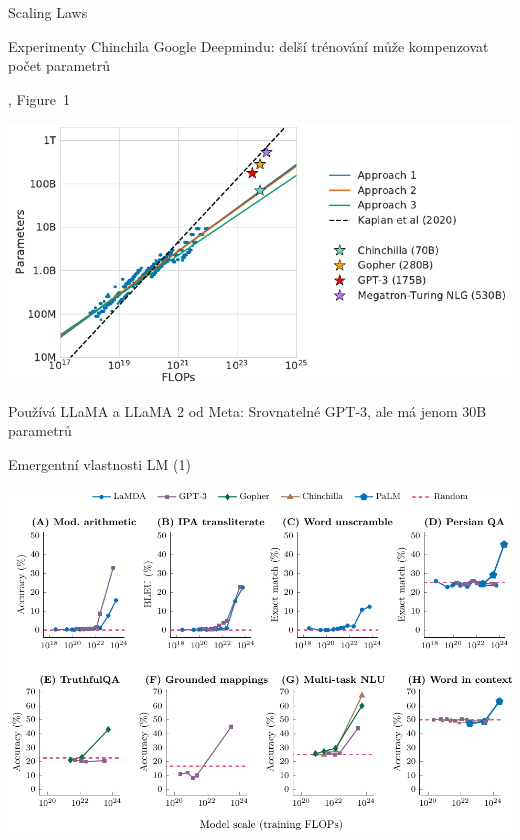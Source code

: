 \documentclass[aspectratio=169,dvipsnames]{beamer}
\begin{document}
\begin{frame}{Scaling Laws}

    \begin{center}
    Experimenty Chinchila Google Deepmindu: delší trénování může kompenzovat počet parametrů

    \begin{minipage}{.9\textwidth}\tiny {}, Figure~1\end{minipage}

    \vspace{5pt}
    \includegraphics[scale=.6]{img/chinchilla.pdf}

    \vspace{10pt}

    Používá LLaMA a LLaMA 2 od Meta: Srovnatelné GPT-3, ale má jenom 30B parametrů \\
    \citep{touvron2023llama}

    \end{center}

\end{frame}


\begin{frame}{Emergentní vlastnosti LM (1)}

    \centering
    \includegraphics[scale=.65]{img/emergent.pdf}\hspace{10pt}

\end{frame}
\end{document}
